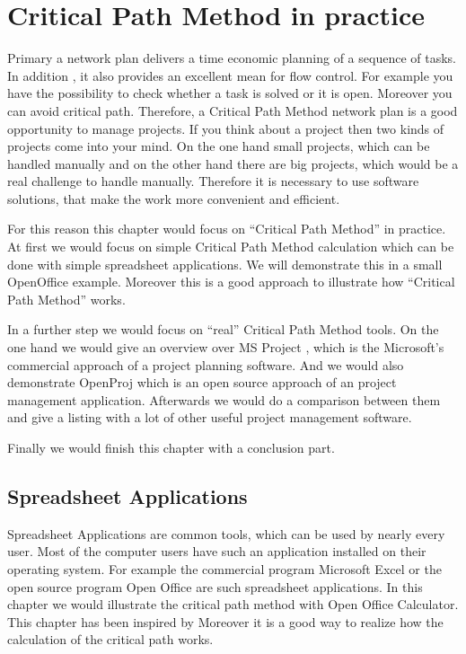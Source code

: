 \section{Critical Path Method in practice}\label{sec:inthefield}
Primary a network plan delivers a time economic planning of a sequence of tasks. In addition , it also provides an excellent mean for flow control. For example you have the possibility to check whether a task is solved or it is open. Moreover you can avoid critical path. Therefore, a Critical Path Method network plan is a good opportunity to manage projects. If you think about a project then two kinds of projects come into your mind. On the one hand small projects, which can be handled manually and on the other hand there are big projects, which would be a real challenge to handle manually. Therefore it is necessary to use software solutions, that make the work more convenient and efficient. 

For this reason this chapter would focus on “Critical Path Method” in practice. At first we would focus on simple Critical Path Method calculation which can be done with simple spreadsheet applications. We will demonstrate this in a small OpenOffice \cite{oo} example. Moreover this is a good approach to illustrate how “Critical Path Method” works.

In a further step we would focus on “real” Critical Path Method tools. On the one hand we would give an overview over MS Project \cite{msp}, which is the Microsoft's commercial approach of a project planning software. And we would also demonstrate OpenProj \cite{opr} which is an open source approach of an project management application. Afterwards we would do a comparison \cite{bright_comparison} between them and give a listing with a lot of other useful project management software.

Finally we would finish this chapter with a conclusion part.

\subsection{Spreadsheet Applications}
Spreadsheet Applications are common tools, which can be used by nearly every user. Most of the computer users have such an application installed on their operating system. For example the commercial program Microsoft Excel \cite{exc} or the open source program Open Office \cite{oo} are such spreadsheet applications. In this chapter we would illustrate the critical path method with Open Office Calculator. This chapter has been inspired by \cite{exceluse} Moreover it is a good way to realize how the calculation of the critical path works.

